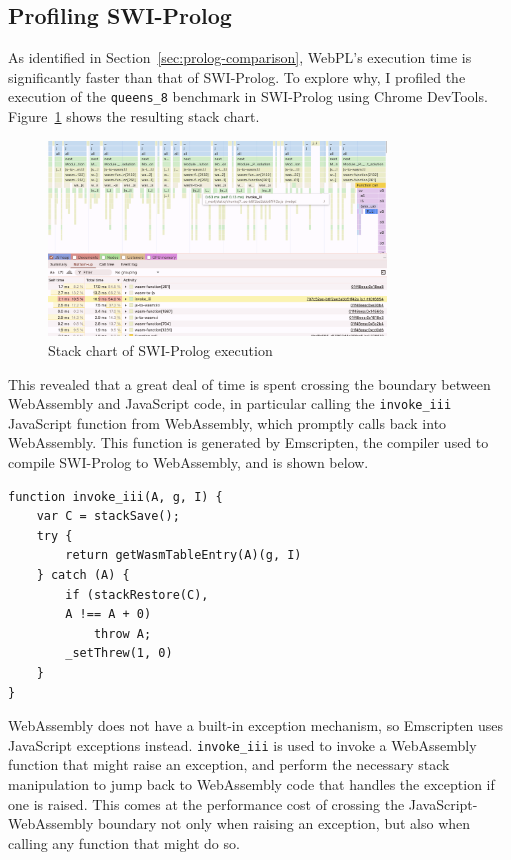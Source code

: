 \subsection{Profiling SWI-Prolog}

As identified in Section~\ref{sec:prolog-comparison}, WebPL's execution time is significantly faster than that of SWI-Prolog. To explore why, I profiled the execution of the \texttt{queens\_8} benchmark in SWI-Prolog using Chrome DevTools. Figure~\ref{fig:swi-prolog-profile} shows the resulting stack chart.

\begin{figure}[H]
\centering
\includegraphics[width=0.8\textwidth]{08evaluation_swiprofiling.png}
\caption{Stack chart of SWI-Prolog execution}
\label{fig:swi-prolog-profile}
\end{figure}

This revealed that a great deal of time is spent crossing the boundary between WebAssembly and JavaScript code, in particular calling the \texttt{invoke\_iii} JavaScript function from WebAssembly, which promptly calls back into WebAssembly. This function is generated by Emscripten, the compiler used to compile SWI-Prolog to WebAssembly, and is shown below.

\begin{center}
\begin{verbatim}
function invoke_iii(A, g, I) {
    var C = stackSave();
    try {
        return getWasmTableEntry(A)(g, I)
    } catch (A) {
        if (stackRestore(C),
        A !== A + 0)
            throw A;
        _setThrew(1, 0)
    }
}
\end{verbatim}
\end{center}

WebAssembly does not have a built-in exception mechanism, so Emscripten uses JavaScript exceptions instead. \texttt{invoke\_iii} is used to invoke a WebAssembly function that might raise an exception, and perform the necessary stack manipulation to jump back to WebAssembly code that handles the exception if one is raised. This comes at the performance cost of crossing the JavaScript-WebAssembly boundary not only when raising an exception, but also when calling any function that might do so.

